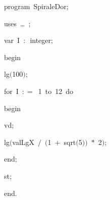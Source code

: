
{
\parindent {}
\medskip

\carrenoir
\vspace{\neglskip}\mbox{\blc  \idt  \mcl program\idt\ SpiraleDor$;$
}\par 
\vspace{\neglskip}\mbox{\blc \blk\idt \mcl uses\idt \ \ldots\ $;$
}\par 
\pagebreak[3] 
\vspace{\neglskip}\mbox{\blc  \blk\idt  \mcl var\idt \ I\ $:$\ integer$;$}\par 
\vspace{\neglskip}\mbox{\blc  \idt  \mcl begin\idt }\par 
\vspace{\neglskip}\mbox{\blc  \blk\idt  lg$($100$)$$;$}\par 
\pagebreak[3] 
\vspace{\neglskip}\mbox{\blc  \blk\idt  \mcl for\idt \ I\ $:$$=$\ 1\ \mcl to\idt \ 12\ \mcl do\idt }\par 
\vspace{\neglskip}\mbox{\blc  \blk\blk\idt  \mcl begin\idt }\par 
\vspace{\neglskip}\mbox{\blc  \blk\blk\blk\idt  vd$;$\ }\par 
\vspace{\neglskip}\mbox{\blc  \blk\blk\blk\idt  lg$($valLgX\ $/$\ $($1\ $+$\ sqrt$($5$)$$)$\ $\ast$\ 2$)$$;$}\par 
\vspace{\neglskip}\mbox{\blc  \blk\blk\idt  \mcl end\idt $;$}\par 
\vspace{\neglskip}\mbox{\blc  \blk\idt  st$;$\ }\par 
\vspace{\neglskip}\mbox{\blc  \idt  \mcl end\idt $.$}\par 

\medskip }

